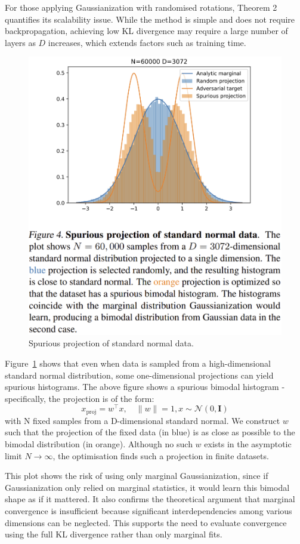 \documentclass[11pt]{report} %
\begin{document}
For those applying Gaussianization with randomised rotations, Theorem 2 quantifies its scalability issue. While the method is simple and does not require backpropagation, achieving low KL divergence may require a large number of layers as $D$ increases, which extends factors such as training time.
\begin{figure}[H]
    \centering
    \renewcommand{\thefigure}{4} %
    \includegraphics[width=0.4\linewidth]{Figure 4.png}
    \caption{Spurious projection of standard normal data.}
    \label{fig:spurious-projection}
    \addtocounter{figure}{-1} %
\end{figure}
\noindent
Figure~\ref{fig:spurious-projection} shows that even when data is sampled from a high-dimensional standard normal distribution, some one-dimensional projections can yield spurious histograms. The above figure shows a spurious bimodal histogram - specifically, the projection is of the form:
\[ x_{\text{proj}} = w^\top x, \quad \|w\| = 1, x \sim \mathcal{N}(0, \mathbf{I})\] 
with N fixed samples from a D-dimensional standard normal.
We construct $w$ such that the projection of the fixed data (in blue) is as close as possible to the bimodal distribution (in orange).
Although no such \( w \) exists in the asymptotic limit \( N \to \infty \), the optimisation finds such a projection in finite datasets. 

This plot shows the risk of using only marginal Gaussianization, since if Gaussianization only relied on marginal statistics, it would learn this bimodal shape as if it mattered.
It also confirms the theoretical argument that marginal convergence is insufficient because significant interdependencies among various dimensions can be neglected. This supports the need to evaluate convergence using the full KL divergence rather than only marginal fits.
\end{document}
